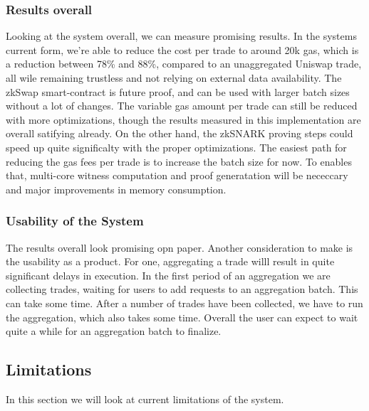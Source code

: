 \documentclass[../../thesis.tex]{subfiles}
\begin{document}
\subsubsection{Results overall}
Looking at the system overall, we can measure promising results. In the systems current form, we're able to reduce the cost per trade to around 20k gas, which is a reduction between 78\% and 88\%, compared to an unaggregated Uniswap trade, all wile remaining trustless and not relying on external data availability. The zkSwap smart-contract is future proof, and can be used with larger batch sizes without a lot of changes. The variable gas amount per trade can still be reduced with more optimizations, though the results measured in this implementation are overall satifying already. On the other hand, the zkSNARK proving steps could speed up quite significalty with the proper optimizations. The easiest path for reducing the gas fees per trade is to increase the batch size for now. To enables that, multi-core witness computation and proof generatation will be nececcary and major improvements in memory consumption. 

\subsubsection{Usability of the System}
The results overall look promising opn paper. Another consideration to make is the usability as a product. For one, aggregating a trade willl result in quite significant delays in execution. In the first period of an aggregation we are collecting trades, waiting for users to add requests to an aggregation batch. This can take some time. After a number of trades have been collected, we have to run the aggregation, which also takes some time. Overall the user can expect to wait quite a while for an  aggregation batch to finalize. 

\subsection{Limitations} \label{limitations}
In this section we will look at current limitations of the system.
\end{document}
